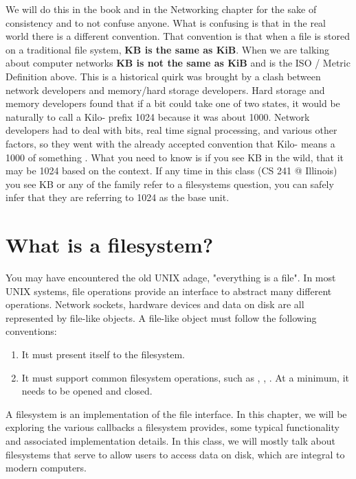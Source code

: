 We will do this in the book and in the Networking chapter for the sake of consistency and to not confuse anyone.
What is confusing is that in the real world there is a different convention.
That convention is that when a file is stored on a traditional file system, \textbf{KB is the same as KiB}.
When we are talking about computer networks \textbf{KB is not the same as KiB} and is the ISO / Metric Definition above.
This is a historical quirk was brought by a clash between network developers and memory/hard storage developers.
Hard storage and memory developers found that if a bit could take one of two states, it would be naturally to call a Kilo- prefix 1024 because it was about 1000.
Network developers had to deal with bits, real time signal processing, and various other factors, so they went with the already accepted convention that Kilo- means a 1000 of something \cite{iec}.
What you need to know is if you see KB in the wild, that it may be 1024 based on the context.
If any time in this class (CS 241 @ Illinois) you see KB or any of the family refer to a filesystems question, you can safely infer that they are referring to 1024 as the base unit.

\section{What is a filesystem?}

You may have encountered the old UNIX adage, "everything is a file".
In most UNIX systems, file operations provide an interface to abstract many different operations.
Network sockets, hardware devices and data on disk are all represented by file-like objects.
A file-like object must follow the following conventions:

\begin{enumerate}
  \item It must present itself to the filesystem.
  \item It must support common filesystem operations, such as , , .
        At a minimum, it needs to be opened and closed.
\end{enumerate}

A filesystem is an implementation of the file interface.
In this chapter, we will be exploring the various callbacks a filesystem provides, some typical functionality and associated implementation details.
In this class, we will mostly talk about filesystems that serve to allow users to access data on disk, which are integral to modern computers.

